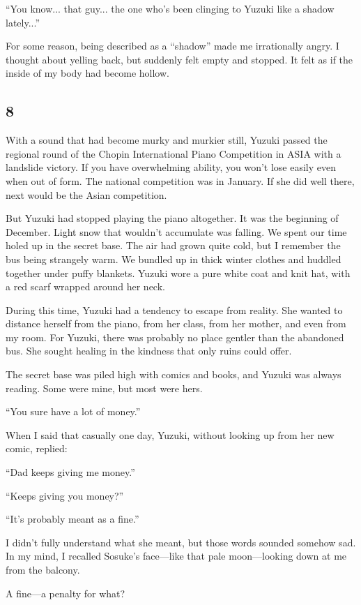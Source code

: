 \documentclass[
    a4paper,
    12pt,
    twoside,
    openany,
    UTF8,
    fontset=windows
]{ctexbook}
\begin{document}
``You know... that guy... the one who's been clinging to Yuzuki like a shadow lately...''

For some reason, being described as a ``shadow'' made me irrationally angry. I thought about yelling back, but suddenly felt empty and stopped. It felt as if the inside of my body had become hollow.


\subsection*{8}

With a sound that had become murky and murkier still, Yuzuki passed the regional round of the Chopin International Piano Competition in ASIA with a landslide victory. If you have overwhelming ability, you won't lose easily even when out of form. The national competition was in January. If she did well there, next would be the Asian competition.

But Yuzuki had stopped playing the piano altogether. It was the beginning of December. Light snow that wouldn't accumulate was falling. We spent our time holed up in the secret base. The air had grown quite cold, but I remember the bus being strangely warm. We bundled up in thick winter clothes and huddled together under puffy blankets. Yuzuki wore a pure white coat and knit hat, with a red scarf wrapped around her neck.

During this time, Yuzuki had a tendency to escape from reality. She wanted to distance herself from the piano, from her class, from her mother, and even from my room. For Yuzuki, there was probably no place gentler than the abandoned bus. She sought healing in the kindness that only ruins could offer.

The secret base was piled high with comics and books, and Yuzuki was always reading. Some were mine, but most were hers.

``You sure have a lot of money.''

When I said that casually one day, Yuzuki, without looking up from her new comic, replied:

``Dad keeps giving me money.''

``Keeps giving you money?''

``It's probably meant as a fine.''

I didn't fully understand what she meant, but those words sounded somehow sad. In my mind, I recalled Sosuke's face---like that pale moon---looking down at me from the balcony.

A fine---a penalty for what?
\end{document}
